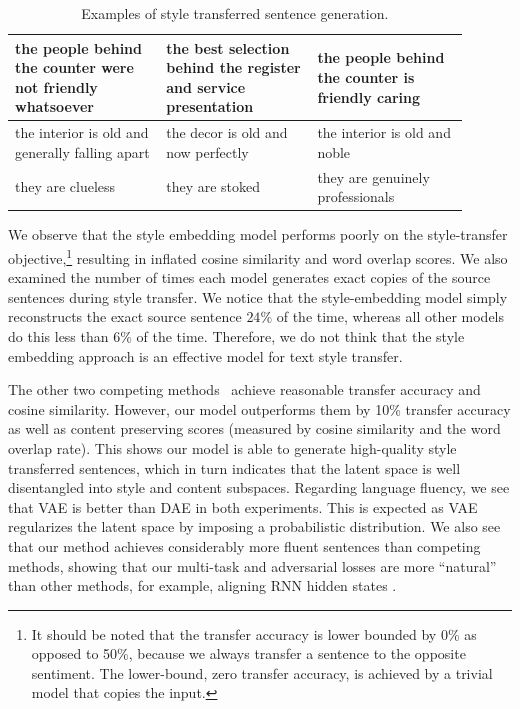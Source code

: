 \documentclass[letterpaper]{article} %
\begin{document}
\begin{table}[!t]
{\begin{tabular}{| p{0.3\linewidth} || p{0.3\linewidth} | p{0.3\linewidth} |}
			\hline
			the people behind the counter were not friendly whatsoever              & the best selection behind the register and service presentation           & the people behind the counter is friendly caring           \\
			\hline
			the interior is old and generally falling apart                         & the decor is old and now perfectly                                        & the interior is old and noble                              \\
			\hline
			they are clueless                                                       & they are stoked                                                           & they are genuinely professionals                           \\
			\hline
		\end{tabular}}\vspace{-.2cm}
	\caption{Examples of style transferred sentence generation.}\vspace{-.2cm}
	\label{tab:transfer-samples}
\end{table}

We observe that the style embedding model \cite{fu2018style} performs poorly on the style-transfer objective,\footnote{It should be noted that the transfer accuracy is lower bounded by 0\% as opposed to 50\%, because we always transfer a sentence to the opposite sentiment. The lower-bound, zero transfer accuracy, is achieved by a trivial model that copies the input.} resulting in inflated cosine similarity and word overlap scores. We also examined the number of times each model generates exact copies of the source sentences during style transfer. We notice that the style-embedding model simply reconstructs the exact source sentence $24\%$ of the time, whereas all other models do this less than $6\%$ of the time. Therefore, we do not think that the style embedding approach is an effective model for text style transfer.

The other two competing methods~\cite{shen2017style,zhao2018adversarially} achieve reasonable transfer accuracy and cosine similarity. However, our model outperforms them by 10\% transfer accuracy as well as content preserving scores (measured by cosine similarity and the word overlap rate). This shows our model is able to generate high-quality style transferred sentences, which in turn indicates that the  latent space  is well disentangled into style and content subspaces. Regarding language fluency, we see that VAE is better than DAE in both experiments. This is expected as VAE regularizes the latent space by imposing a probabilistic distribution. We also see that our method achieves considerably more fluent sentences than competing methods, showing that our multi-task and adversarial losses are more ``natural'' than other methods, for example, aligning RNN hidden states \cite{shen2017style}.
\end{document}

